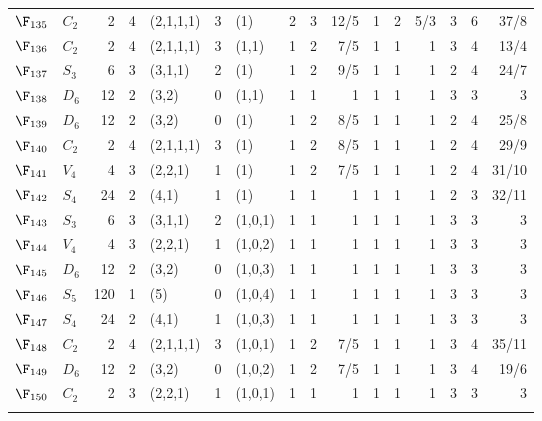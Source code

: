 \begin{landscape}
{\begin{longtable}{@{}l l r r l r l rrr rrr rrr@{}}
\addlinespace[3pt]
\textbf{$\F_{135}$} & $C_{2}$ & 2 & 4 & (2,1,1,1) & 3 & (1) & 2 & 3 & 12/5 & 1 & 2 & 5/3 & 3 & 6 & 37/8 \\
\addlinespace[3pt]
\textbf{$\F_{136}$} & $C_{2}$ & 2 & 4 & (2,1,1,1) & 3 & (1,1) & 1 & 2 & 7/5 & 1 & 1 & 1 & 3 & 4 & 13/4 \\
\addlinespace[3pt]
\textbf{$\F_{137}$} & $S_{3}$ & 6 & 3 & (3,1,1) & 2 & (1) & 1 & 2 & 9/5 & 1 & 1 & 1 & 2 & 4 & 24/7 \\
\addlinespace[3pt]
\textbf{$\F_{138}$} & $D_{6}$ & 12 & 2 & (3,2) & 0 & (1,1) & 1 & 1 & 1 & 1 & 1 & 1 & 3 & 3 & 3 \\
\addlinespace[3pt]
\textbf{$\F_{139}$} & $D_{6}$ & 12 & 2 & (3,2) & 0 & (1) & 1 & 2 & 8/5 & 1 & 1 & 1 & 2 & 4 & 25/8 \\
\addlinespace[3pt]
\textbf{$\F_{140}$} & $C_{2}$ & 2 & 4 & (2,1,1,1) & 3 & (1) & 1 & 2 & 8/5 & 1 & 1 & 1 & 2 & 4 & 29/9 \\
\addlinespace[3pt]
\textbf{$\F_{141}$} & $V_{4}$ & 4 & 3 & (2,2,1) & 1 & (1) & 1 & 2 & 7/5 & 1 & 1 & 1 & 2 & 4 & 31/10 \\
\addlinespace[3pt]
\textbf{$\F_{142}$} & $S_{4}$ & 24 & 2 & (4,1) & 1 & (1) & 1 & 1 & 1 & 1 & 1 & 1 & 2 & 3 & 32/11 \\
\addlinespace[3pt]
\textbf{$\F_{143}$} & $S_{3}$ & 6 & 3 & (3,1,1) & 2 & (1,0,1) & 1 & 1 & 1 & 1 & 1 & 1 & 3 & 3 & 3 \\
\addlinespace[3pt]
\textbf{$\F_{144}$} & $V_{4}$ & 4 & 3 & (2,2,1) & 1 & (1,0,2) & 1 & 1 & 1 & 1 & 1 & 1 & 3 & 3 & 3 \\
\addlinespace[3pt]
\textbf{$\F_{145}$} & $D_{6}$ & 12 & 2 & (3,2) & 0 & (1,0,3) & 1 & 1 & 1 & 1 & 1 & 1 & 3 & 3 & 3 \\
\addlinespace[3pt]
\textbf{$\F_{146}$} & $S_{5}$ & 120 & 1 & (5) & 0 & (1,0,4) & 1 & 1 & 1 & 1 & 1 & 1 & 3 & 3 & 3 \\
\addlinespace[3pt]
\textbf{$\F_{147}$} & $S_{4}$ & 24 & 2 & (4,1) & 1 & (1,0,3) & 1 & 1 & 1 & 1 & 1 & 1 & 3 & 3 & 3 \\
\addlinespace[3pt]
\textbf{$\F_{148}$} & $C_{2}$ & 2 & 4 & (2,1,1,1) & 3 & (1,0,1) & 1 & 2 & 7/5 & 1 & 1 & 1 & 3 & 4 & 35/11 \\
\addlinespace[3pt]
\textbf{$\F_{149}$} & $D_{6}$ & 12 & 2 & (3,2) & 0 & (1,0,2) & 1 & 2 & 7/5 & 1 & 1 & 1 & 3 & 4 & 19/6 \\
\addlinespace[3pt]
\textbf{$\F_{150}$} & $C_{2}$ & 2 & 3 & (2,2,1) & 1 & (1,0,1) & 1 & 1 & 1 & 1 & 1 & 1 & 3 & 3 & 3 \\
\addlinespace[3pt]

\end{longtable}}
\end{landscape}
